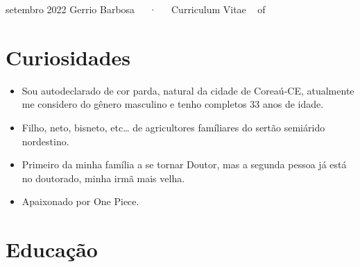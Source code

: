 \documentclass[11pt,a4paper,]{awesome-cv}
\begin{document}
\makecvheader

\makecvfooter
  {setembro 2022}
    {Gerrio Barbosa~~~·~~~Curriculum Vitae}
  {\thepage~ of \pageref{LastPage}~}





\hypertarget{curiosidades}{%
\section{Curiosidades}\label{curiosidades}}

\begin{itemize}
\item
  Sou autodeclarado de cor parda, natural da cidade de Coreaú-CE,
  atualmente me considero do gênero masculino e tenho completos 33 anos
  de idade.
\item
  Filho, neto, bisneto, etc\ldots{} de agricultores famíliares do sertão
  semiárido nordestino.
\item
  Primeiro da minha família a se tornar Doutor, mas a segunda pessoa já
  está no doutorado, minha irmã mais velha.
\item
  Apaixonado por One Piece.
\end{itemize}

\hypertarget{educauxe7uxe3o}{%
\section{Educação}\label{educauxe7uxe3o}}

\begin{cventries}
    \vspace{-4.0mm}
    \vspace{-4.0mm}
    \vspace{-4.0mm}
    \vspace{-4.0mm}
\end{cventries}
\end{document}
